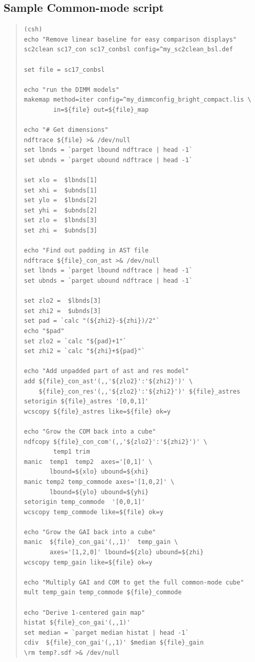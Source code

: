\documentclass[twoside,11pt]{article}
\newcommand{\xlabel}[1]{}
\renewcommand{\_}{\texttt{\symbol{95}}}
\newenvironment{myquote}{\begin{quote}\begin{small}}{\end{small}\end{quote}}
\begin{document}
\newpage
\subsection{\xlabel{script}Sample Common-mode script}
\label{sec:script}

\begin{myquote}
\begin{verbatim}
(csh)
echo "Remove linear baseline for easy comparison displays"
sc2clean sc17_con sc17_conbsl config=^my_sc2clean_bsl.def

set file = sc17_conbsl

echo "run the DIMM models"
makemap method=iter config=^my_dimmconfig_bright_compact.lis \
        in=${file} out=${file}_map

echo "# Get dimensions"
ndftrace ${file} >& /dev/null
set lbnds = `parget lbound ndftrace | head -1`
set ubnds = `parget ubound ndftrace | head -1`

set xlo =  $lbnds[1]
set xhi =  $ubnds[1]
set ylo =  $lbnds[2]
set yhi =  $ubnds[2]
set zlo =  $lbnds[3]
set zhi =  $ubnds[3]

echo "Find out padding in AST file
ndftrace ${file}_con_ast >& /dev/null
set lbnds = `parget lbound ndftrace | head -1`
set ubnds = `parget ubound ndftrace | head -1`

set zlo2 =  $lbnds[3]
set zhi2 =  $ubnds[3]
set pad = `calc "(${zhi2}-${zhi})/2"`
echo "$pad"
set zlo2 = `calc "${pad}+1"`
set zhi2 = `calc "${zhi}+${pad}"`

echo "Add unpadded part of ast and res model"
add ${file}_con_ast'(,,'${zlo2}':'${zhi2}')' \
    ${file}_con_res'(,,'${zlo2}':'${zhi2}')' ${file}_astres
setorigin ${file}_astres '[0,0,1]'
wcscopy ${file}_astres like=${file} ok=y

echo "Grow the COM back into a cube"
ndfcopy ${file}_con_com'(,,'${zlo2}':'${zhi2}')' \
        temp1 trim
manic  temp1  temp2  axes='[0,1]' \
       lbound=${xlo} ubound=${xhi}
manic temp2 temp_commode axes='[1,0,2]' \
       lbound=${ylo} ubound=${yhi}
setorigin temp_commode  '[0,0,1]'
wcscopy temp_commode like=${file} ok=y

echo "Grow the GAI back into a cube"
manic  ${file}_con_gai'(,,1)'  temp_gain \
       axes='[1,2,0]' lbound=${zlo} ubound=${zhi}
wcscopy temp_gain like=${file} ok=y

echo "Multiply GAI and COM to get the full common-mode cube"
mult temp_gain temp_commode ${file}_commode

echo "Derive 1-centered gain map"
histat ${file}_con_gai'(,,1)'
set median = `parget median histat | head -1`
cdiv  ${file}_con_gai'(,,1)' $median ${file}_gain
\rm temp?.sdf >& /dev/null
\end{verbatim}
\end{myquote}
\end{document}
